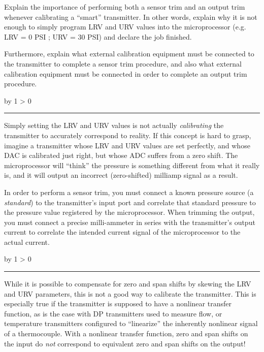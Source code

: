 \documentclass[12pt,a4paper]{article}
\def\svar{
           \advance\answnum by 1
           \ifnum \answnum > 0
                \hrule
                \vskip 3pt
                \leftline{Svar \the\answnum}
                \vskip 3pt \fi}
\def\notes{
           \advance\explnum by 1
           \ifnum \explnum > 0
                \hrule
                \vskip 3pt
                \leftline{Notes \the\explnum}
                \vskip 3pt \fi}
\begin{document}
\vskip 10pt

Explain the importance of performing both a sensor trim and an output trim whenever calibrating a ``smart'' transmitter.  In other words, explain why it is not enough to simply program LRV and URV values into the microprocessor (e.g. LRV = 0 PSI ; URV = 30 PSI) and declare the job finished.

Furthermore, explain what external calibration equipment must be connected to the transmitter to complete a sensor trim procedure, and also what external calibration equipment must be connected in order to complete an output trim procedure.

\vskip 10pt \filbreak 





\svar{} 

Simply setting the LRV and URV values is not actually {\it calibrating} the transmitter to accurately correspond to reality.  If this concept is hard to grasp, imagine a transmitter whose LRV and URV values are set perfectly, and whose DAC is calibrated just right, but whose ADC suffers from a zero shift.  The microprocessor will ``think'' the pressure is something different from what it really is, and it will output an incorrect (zero-shifted) milliamp signal as a result.

\vskip 10pt

In order to perform a sensor trim, you must connect a known pressure source (a {\it standard}) to the transmitter's input port and correlate that standard pressure to the pressure value registered by the microprocessor.  When trimming the output, you must connect a precise milli-ammeter in series with the transmitter's output current to correlate the intended current signal of the microprocessor to the actual current.

\vskip 10pt \filbreak 





\notes{} 

While it is possible to compensate for zero and span shifts by skewing the LRV and URV parameters, this is not a good way to calibrate the transmitter.  This is especially true if the transmitter is supposed to have a nonlinear transfer function, as is the case with DP transmitters used to measure flow, or temperature transmitters configured to ``linearize'' the inherently nonlinear signal of a thermocouple.  With a nonlinear transfer function, zero and span shifts on the input do {\it not} correspond to equivalent zero and span shifts on the output!
\end{document}
